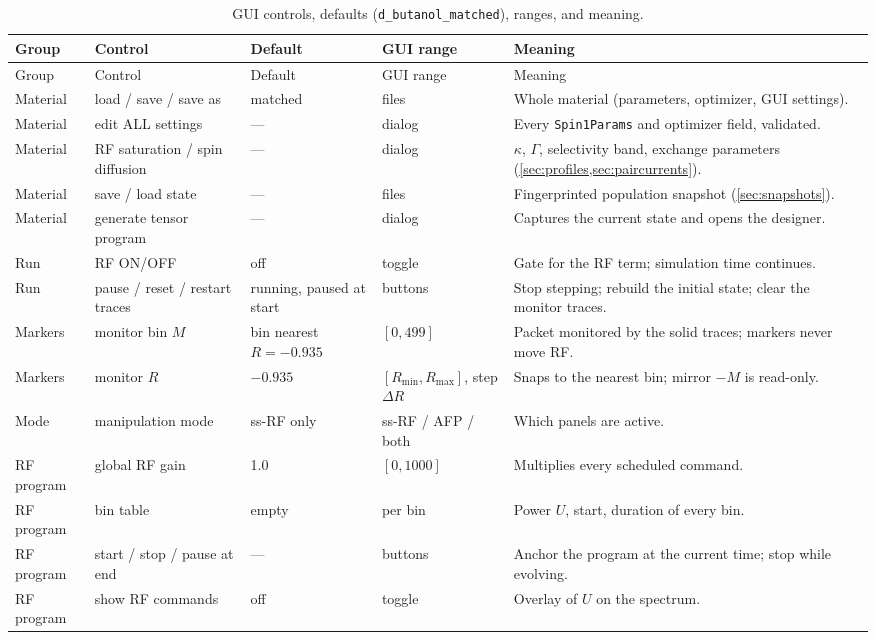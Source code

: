 \documentclass[11pt]{article}
\newcommand{\code}[1]{\texttt{#1}}
\begin{document}
\begin{longtable}{@{}L{0.14\textwidth} L{0.20\textwidth} L{0.11\textwidth} L{0.14\textwidth} L{0.30\textwidth}@{}}
\caption{GUI controls, defaults (\code{d\_butanol\_matched}), ranges, and meaning.}\label{tab:guicontrols}\\
\toprule
Group & Control & Default & GUI range & Meaning\\
\midrule
\endfirsthead
\toprule
Group & Control & Default & GUI range & Meaning\\
\midrule
\endhead
Material & load / save / save as & matched & files & Whole material (parameters, optimizer, GUI settings).\\
Material & edit ALL settings & --- & dialog & Every \code{Spin1Params} and optimizer field, validated.\\
Material & RF saturation / spin diffusion & --- & dialog & \(\kappa\), \(\Gamma\), selectivity band, exchange parameters (\cref{sec:profiles,sec:paircurrents}).\\
Material & save / load state & --- & files & Fingerprinted population snapshot (\cref{sec:snapshots}).\\
Material & generate tensor program & --- & dialog & Captures the current state and opens the designer.\\
\midrule
Run & RF ON/OFF & off & toggle & Gate for the RF term; simulation time continues.\\
Run & pause / reset / restart traces & running, paused at start & buttons & Stop stepping; rebuild the initial state; clear the monitor traces.\\
\midrule
Markers & monitor bin \(M\) & bin nearest \(R=-0.935\) & \([0,499]\) & Packet monitored by the solid traces; markers never move RF.\\
Markers & monitor \(R\) & \(-0.935\) & \([R_{\min},R_{\max}]\), step \(\Delta R\) & Snaps to the nearest bin; mirror \(-M\) is read-only.\\
\midrule
Mode & manipulation mode & ss-RF only & ss-RF / AFP / both & Which panels are active.\\
\midrule
RF program & global RF gain & 1.0 & \([0,1000]\) & Multiplies every scheduled command.\\
RF program & bin table & empty & per bin & Power \(U\), start, duration of every bin.\\
RF program & start / stop / pause at end & --- & buttons & Anchor the program at the current time; stop while evolving.\\
RF program & show RF commands & off & toggle & Overlay of \(U\) on the spectrum.\\

\end{longtable}
\end{document}
